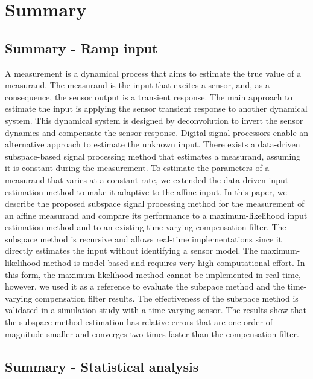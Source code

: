 \chapter{Summary} \label{chap:Summary}


\section{Summary - Ramp input}

A measurement is a dynamical process that aims to estimate the true value of a measurand.
The measurand is the input that excites a sensor, and, as a consequence, the sensor output is a transient response. 
The main approach to estimate the input is applying the sensor transient response to another dynamical system. 
This dynamical system is designed by deconvolution to invert the sensor dynamics and compensate the sensor response. 
Digital signal processors enable an alternative approach to estimate the unknown input.
There exists a data-driven subspace-based signal processing method that estimates a measurand, assuming it is constant during the measurement.
To estimate the parameters of a measurand that varies at a constant rate, 
we extended the data-driven input estimation method to make it adaptive to the affine input.
In this paper, we describe the proposed subspace signal processing method for the measurement of an affine measurand and compare its performance to a maximum-likelihood input estimation method and to an existing time-varying compensation filter.
The subspace method is recursive and allows real-time implementations since it directly estimates the input without identifying a sensor model.
The maximum-likelihood method is model-based and requires very high computational effort.
In this form, the maximum-likelihood method cannot be implemented in real-time, however, we used it as a reference to evaluate the subspace method and the time-varying compensation filter results.
The effectiveness of the subspace method is validated in a simulation study with a time-varying sensor.
The results show that the subspace method estimation has relative errors that are one order of magnitude smaller and converges two times faster than the compensation filter.


\section{Summary - Statistical analysis}

